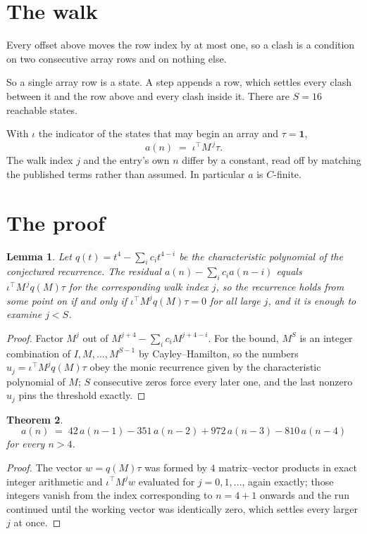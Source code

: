 \documentclass[11pt,a4paper]{article}
\theoremstyle{plain}
\newtheorem{theorem}{Theorem}
\newtheorem{lemma}[theorem]{Lemma}
\theoremstyle{definition}
\begin{document}
\section{The walk}

Every offset above moves the row index by at most one, so a clash is a condition on two
consecutive array rows and on nothing else.

So a single array row is a state. A step appends a row, which settles every clash between it
and the row above and every clash inside it. There are $S=16$ reachable states.

With $\iota$ the indicator of the states that may begin an array and $\tau=\mathbf{1}$,
\[
a(n)\;=\;\iota^{\!\top}M^{\,j}\tau .
\]
The walk index $j$ and the entry's own $n$ differ by a constant, read off by matching the
published terms rather than assumed. In particular $a$ is $C$-finite.

\section{The proof}

\begin{lemma}\label{lem:crit}
Let $q(t)=t^{4}-\sum_i c_it^{4-i}$ be the characteristic polynomial of the
conjectured recurrence. The residual $a(n)-\sum_ic_ia(n-i)$ equals
$\iota^{\!\top}M^{\,j}q(M)\tau$ for the corresponding walk index $j$, so the recurrence
holds from some point on if and only if $\iota^{\!\top}M^{j}q(M)\tau=0$ for all large $j$,
and it is enough to examine $j<S$.
\end{lemma}

\begin{proof}
Factor $M^{j}$ out of $M^{j+4}-\sum_ic_iM^{j+4-i}$. For the bound, $M^{S}$
is an integer combination of $I,M,\dots,M^{S-1}$ by Cayley--Hamilton, so the numbers
$u_j=\iota^{\!\top}M^{j}q(M)\tau$ obey the monic recurrence given by the characteristic
polynomial of $M$; $S$ consecutive zeros force every later one, and the last nonzero $u_j$
pins the threshold exactly.
\end{proof}

\begin{theorem}
\[
a(n)\;=\;42\,a(n-1) - 351\,a(n-2) + 972\,a(n-3) - 810\,a(n-4)
\]
for every $n>4$.
\end{theorem}

\begin{proof}
The vector $w=q(M)\tau$ was formed by $4$ matrix--vector products in exact integer
arithmetic and $\iota^{\!\top}M^{j}w$ evaluated for $j=0,1,\dots$, again exactly; those
integers vanish from the index corresponding to $n=4+1$ onwards and the run continued
until the working vector was identically zero, which settles every larger $j$ at once.
\end{proof}
\end{document}
